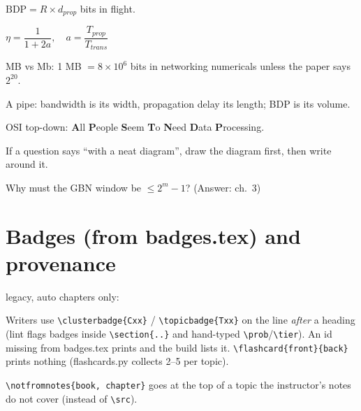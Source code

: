 \documentclass[11pt,a4paper]{report}
\begin{document}
\begin{definitionbox}  $\text{BDP}=R\times d_{prop}$ bits in flight. \end{definitionbox}
\begin{formulabox} $\eta=\dfrac{1}{1+2a},\quad a=\dfrac{T_{prop}}{T_{trans}}$\end{formulabox}
\begin{warningbox}MB vs Mb: 1 MB $=8\times10^6$ bits in networking numericals unless the paper says $2^{20}$.\end{warningbox}
\begin{intuitionbox}A pipe: bandwidth is its width, propagation delay its length; BDP is its volume.\end{intuitionbox}
\begin{mnemonicbox}OSI top-down: \textbf{A}ll \textbf{P}eople \textbf{S}eem \textbf{T}o \textbf{N}eed \textbf{D}ata \textbf{P}rocessing.\end{mnemonicbox}
\begin{examtip}If a question says ``with a neat diagram'', draw the diagram first, then write around it.\end{examtip}
\begin{checkpoint}Why must the GBN window be $\le 2^m-1$? (Answer: ch.~3)\end{checkpoint}

\section{Badges (from badges.tex) and provenance}
     
\quad legacy, auto chapters only:        

Writers use \verb|\clusterbadge{Cxx}| / \verb|\topicbadge{Txx}| on the line \emph{after} a heading (lint flags
badges inside \verb|\section{..}| and hand-typed \verb|\prob|/\verb|\tier|). An id missing from badges.tex prints
 and the build lists it.
%
\verb|\flashcard{front}{back}| prints nothing (flashcards.py collects 2--5 per topic).

\verb|\notfromnotes{book, chapter}| goes at the top of a topic the instructor's notes do not cover (instead of \verb|\src|).
\end{document}
